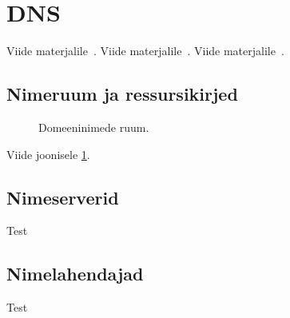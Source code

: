 \documentclass[../main.tex]{subfiles}
\begin{document}
\newpage
\section{DNS}

Viide materjalile~\cite{rfc1034}.
Viide materjalile~\cite{rfc1035}.
Viide materjalile~\cite{laaneoks2010}.

\subsection{Nimeruum ja ressursikirjed}

\begin{figure}[ht]
  \caption{Domeeninimede ruum.}
  \label{fig:domain-name-space}
\end{figure}

Viide joonisele \ref{fig:domain-name-space}.

\subsection{Nimeserverid}

Test

\subsection{Nimelahendajad}

Test
\end{document}
